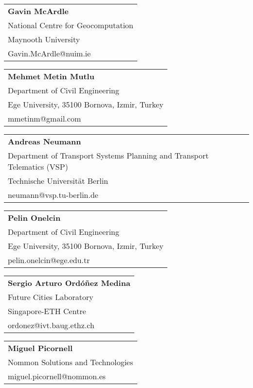 \begin{tabular}[width=0.48\textwidth]{@{}l}
\textbf{Gavin McArdle} \\
National Centre for Geocomputation \\
Maynooth University \\
Gavin.McArdle@nuim.ie \\
\end{tabular}

\begin{tabular}[width=0.48\textwidth]{@{}l}
\textbf{Mehmet Metin Mutlu} \\
Department of Civil Engineering \\
Ege University, 35100 Bornova, Izmir, Turkey \\
mmetinm@gmail.com \\
\end{tabular}

\begin{tabular}[width=0.48\textwidth]{@{}l}
\textbf{Andreas Neumann} \\
Department of Transport Systems Planning and Transport Telematics (VSP) \\
Technische Universität Berlin \\
neumann@vsp.tu-berlin.de \\
\end{tabular}

\begin{tabular}[width=0.48\textwidth]{@{}l}
\textbf{Pelin Onelcin} \\
Department of Civil Engineering \\
Ege University, 35100 Bornova, Izmir, Turkey \\
pelin.onelcin@ege.edu.tr \\
\end{tabular}

\begin{tabular}[width=0.48\textwidth]{@{}l}
\textbf{Sergio Arturo Ordóñez Medina} \\
Future Cities Laboratory \\
Singapore-ETH Centre\\
ordonez@ivt.baug.ethz.ch \\
\end{tabular}

\begin{tabular}[width=0.48\textwidth]{@{}l}
\textbf{Miguel Picornell} \\
Nommon Solutions and Technologies \\
miguel.picornell@nommon.es \\
\end{tabular}

